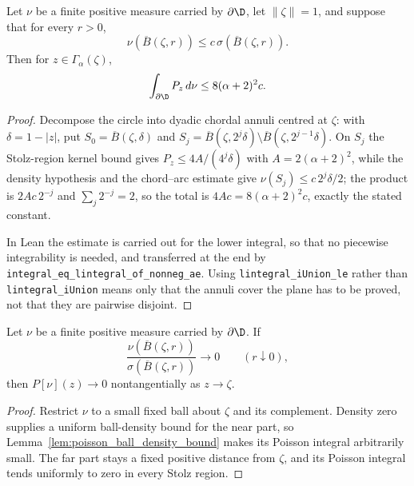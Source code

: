 \begin{lemma}
  \label{lem:poisson_ball_density_bound}
  \leanok
  Let $\nu$ be a finite positive measure carried by $\partial\D$, let
  $\|\zeta\|=1$, and suppose that for every $r>0$,
  \[
    \nu(\overline B(\zeta,r))
      \le c\,\sigma(\overline B(\zeta,r)).
  \]
  Then for $z\in\Gamma_\alpha(\zeta)$,
  \[
    \int_{\partial\D}P_z\,d\nu\le 8(\alpha+2)^2c.
  \]
  \begin{proof}
    \leanok
    Decompose the circle into dyadic chordal annuli centred at $\zeta$: with
    $\delta=1-|z|$, put $S_0=\overline B(\zeta,\delta)$ and
    $S_j=\overline B(\zeta,2^j\delta)\setminus\overline B(\zeta,2^{j-1}\delta)$.
    On $S_j$ the Stolz-region kernel bound gives
    $P_z\le 4A/(4^j\delta)$ with $A=2(\alpha+2)^2$, while the density
    hypothesis and the chord--arc estimate give
    $\nu(S_j)\le c\,2^j\delta/2$; the product is $2Ac\,2^{-j}$ and
    $\sum_j 2^{-j}=2$, so the total is $4Ac=8(\alpha+2)^2c$, exactly the
    stated constant.

    In Lean the estimate is carried out for the lower integral, so that no
    piecewise integrability is needed, and transferred at the end by
    \texttt{integral\_eq\_lintegral\_of\_nonneg\_ae}. Using
    \texttt{lintegral\_iUnion\_le} rather than \texttt{lintegral\_iUnion}
    means only that the annuli cover the plane has to be proved, not that they
    are pairwise disjoint.
  \end{proof}
\end{lemma}

\begin{lemma}
  \label{lem:poisson_density_zero}
  \leanok
  Let $\nu$ be a finite positive measure carried by $\partial\D$. If
  \[
    \frac{\nu(\overline B(\zeta,r))}
         {\sigma(\overline B(\zeta,r))}\longrightarrow0
    \qquad(r\downarrow0),
  \]
  then $P[\nu](z)\to0$ nontangentially as $z\to\zeta$.
  \begin{proof}
    \leanok
    Restrict $\nu$ to a small fixed ball about $\zeta$ and its complement.
    Density zero supplies a uniform ball-density bound for the near part, so
    Lemma~\ref{lem:poisson_ball_density_bound} makes its Poisson integral
    arbitrarily small. The far part stays a fixed positive distance from
    $\zeta$, and its Poisson integral tends uniformly to zero in every Stolz
    region.
  \end{proof}
\end{lemma}

